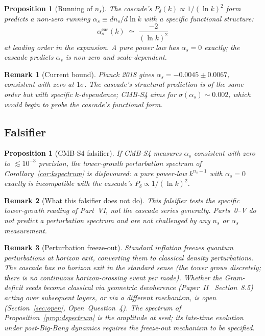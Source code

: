 \documentclass[12pt,a4paper]{article}
\newtheorem{proposition}[theorem]{Proposition}
\newtheorem*{remark}{Remark}
\begin{document}
\begin{proposition}[Running of $n_s$]\label{prop:running}
The cascade's $P_\delta(k) \propto 1/(\ln k)^2$ form predicts a non-zero
running $\alpha_s \equiv d n_s / d\!\ln k$ with a specific functional structure:
\[
\alpha_s^{\mathrm{cas}}(k) \;\simeq\; \frac{-2}{(\ln k)^2}
\]
at leading order in the expansion. A pure power law has $\alpha_s = 0$ exactly;
the cascade predicts $\alpha_s$ is non-zero and scale-dependent.
\end{proposition}

\begin{remark}[Current bound]
Planck 2018 gives $\alpha_s = -0.0045 \pm 0.0067$, consistent with zero at
$1\sigma$. The cascade's structural prediction is of the same order but with
specific $k$-dependence; CMB-S4 aims for $\sigma(\alpha_s) \sim 0.002$, which
would begin to probe the cascade's functional form.
\end{remark}

\subsection{Falsifier}

\begin{proposition}[CMB-S4 falsifier]\label{prop:CMBS4-falsifier}
If CMB-S4 measures $\alpha_s$ consistent with zero to $\lesssim 10^{-3}$
precision, the tower-growth perturbation spectrum of
Corollary~\ref{cor:kspectrum} is disfavoured: a pure power-law $k^{n_s-1}$
with $\alpha_s = 0$ exactly is incompatible with the cascade's
$P_\delta \propto 1/(\ln k)^2$.
\end{proposition}

\begin{remark}[What this falsifier does not do]
This falsifier tests the specific tower-growth reading of Part~VI, not the
cascade series generally. Parts~0--V do not predict a perturbation spectrum
and are not challenged by any $n_s$ or $\alpha_s$ measurement.
\end{remark}

\begin{remark}[Perturbation freeze-out]
Standard inflation freezes quantum perturbations at horizon exit, converting
them to classical density perturbations. The cascade has no horizon exit in
the standard sense (the tower grows discretely; there is no continuous
horizon-crossing event per mode). Whether the Gram-deficit seeds become
classical via geometric decoherence (Paper~II~\cite{part2} Section~8.5) acting
over subsequent layers, or via a different mechanism, is open
(Section~\ref{sec:open}, Open~Question~4). The spectrum of
Proposition~\ref{prop:dspectrum} is the amplitude \emph{at seed}; its late-time
evolution under post-Big-Bang dynamics requires the freeze-out mechanism to be
specified.
\end{remark}
\end{document}
